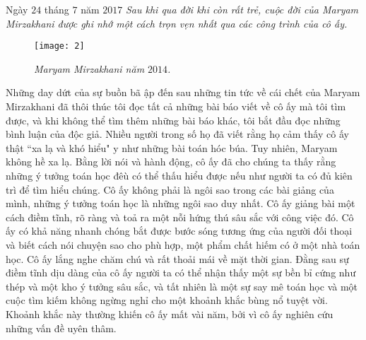 \pagestyle{codienhiendai}
\thispagestyle{codienhiendainone}
\graphicspath{{../codienhiendai/pic/}}
\begingroup
{}
\centering
\endgroup

\vspace*{220pt}
\begin{multicols}{2}
	Ngày $24$ tháng $7$ năm $2017$
	\vskip 0.1cm
	\textit{Sau khi qua đời khi còn rất trẻ, cuộc đời của Maryam Mirzakhani được {\color[named]{codienhiendai}ghi nhớ một cách} trọn vẹn nhất qua các công trình của cô ấy.}
	\begin{figure}[H]
		\centering
		\vspace*{-5pt}
		\captionsetup{labelformat= empty, justification=centering}
		\texttt{[image: 2]}
		\caption{\small\textit{{\color[named]{codienhiendai}Maryam Mirzakhani năm $2014$.}}}
		\vspace*{-10pt}
	\end{figure}
	Những day dứt của sự buồn bã ập đến sau những tin tức về {\color[named]{codienhiendai}cái chết} của Maryam \linebreak Mirzakhani đã thôi thúc tôi đọc tất cả những bài báo viết về cô ấy mà tôi tìm được, và khi không thể tìm thêm những bài báo khác, tôi bắt đầu đọc những bình luận của độc giả. Nhiều người trong số họ đã viết rằng họ cảm thấy cô ấy thật ``xa lạ và khó hiểu" y như những bài toán hóc búa. Tuy nhiên, Maryam không hề xa lạ. Bằng lời nói và hành động, cô ấy đã cho chúng ta thấy rằng những ý tưởng toán học đêù có thể thấu hiểu được nếu như người ta có đủ kiên trì để tìm hiểu chúng.
	\vskip 0.1cm
	Cô ấy không phải là ngôi sao trong các bài giảng của mình, những ý tưởng toán học là những ngôi sao duy nhất. Cô ấy giảng bài một cách điềm tĩnh, rõ ràng và {\color[named]{codienhiendai}toả ra một nỗi} hứng thú {\color[named]{codienhiendai}sâu sắc} với công việc đó. 
	\vskip 0.1cm
	Cô ấy có khả năng nhanh chóng bắt được {\color[named]{codienhiendai}bước} sóng {\color[named]{codienhiendai}tương ứng} của người đối thoại và biết cách nói chuyện sao cho phù hợp, một phẩm chất hiếm có ở một nhà toán học. Cô ấy lắng nghe chăm chú và rất thoải mái về mặt thời gian. Đằng sau sự {\color[named]{codienhiendai}điềm tĩnh} dịu dàng của cô ấy người ta có thể nhận thấy một sự bền bỉ cứng như thép và một kho ý tưởng sâu sắc, và tất nhiên là một sự say mê toán học và một cuộc tìm kiếm không ngừng nghỉ cho một khoảnh khắc bùng nổ tuyệt vời. Khoảnh khắc này thường khiến cô ấy mất vài năm, bởi vì cô ấy nghiên cứu những vấn đề uyên thâm.

\end{multicols}
